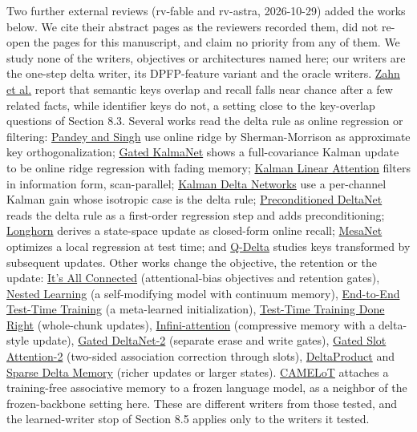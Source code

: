Two further external reviews (rv-fable and rv-astra, 2026-10-29) added the works
below. We cite their abstract pages as the reviewers recorded them, did not re-open the pages for this manuscript, and claim no priority from any of them.
We study none of the writers, objectives or architectures named here; our writers are the one-step delta writer, its DPFP-feature variant and the oracle writers.
\href{https://arxiv.org/abs/2601.15313}{Zahn et al.} report that semantic keys overlap and recall falls near chance after a few related facts, while identifier keys do
not, a setting close to the key-overlap questions of Section 8.3. Several works read the delta rule as online regression or filtering:
\href{https://arxiv.org/abs/2605.11196}{Pandey and Singh} use online ridge by Sherman-Morrison as approximate key orthogonalization;
\href{https://arxiv.org/abs/2511.21016}{Gated KalmaNet} shows a full-covariance Kalman update to be online ridge regression with fading memory;
\href{https://arxiv.org/abs/2602.10743}{Kalman Linear Attention} filters in information form, scan-parallel;
\href{https://arxiv.org/abs/2609.07816}{Kalman Delta Networks} use a per-channel Kalman gain whose isotropic case is the delta rule;
\href{https://arxiv.org/abs/2604.21100}{Preconditioned DeltaNet} reads the delta rule as a first-order regression step and adds preconditioning;
\href{https://arxiv.org/abs/2407.14207}{Longhorn} derives a state-space update as closed-form online recall;
\href{https://arxiv.org/abs/2506.05233}{MesaNet} optimizes a local regression at test time; and
\href{https://arxiv.org/abs/2606.08804}{Q-Delta} studies keys transformed by subsequent updates. Other works change the objective, the retention or the update:
\href{https://arxiv.org/abs/2504.13173}{It’s All Connected} (attentional-bias objectives and retention gates),
\href{https://arxiv.org/abs/2512.24695}{Nested Learning} (a self-modifying model with continuum memory),
\href{https://arxiv.org/abs/2512.23675}{End-to-End Test-Time Training} (a meta-learned initialization),
\href{https://arxiv.org/abs/2505.23884}{Test-Time Training Done Right} (whole-chunk updates),
\href{https://arxiv.org/abs/2404.07143}{Infini-attention} (compressive memory with a delta-style update),
\href{https://arxiv.org/abs/2605.22791}{Gated DeltaNet-2} (separate erase and write gates),
\href{https://arxiv.org/abs/2610.02816}{Gated Slot Attention-2} (two-sided association correction through slots),
\href{https://arxiv.org/abs/2502.10297}{DeltaProduct} and \href{https://arxiv.org/abs/2607.07386}{Sparse Delta Memory} (richer updates or larger states).
\href{https://arxiv.org/abs/2402.13449}{CAMELoT} attaches a training-free associative memory to a frozen language model, as a neighbor of the frozen-backbone
setting here. These are different writers from those tested, and the learned-writer stop of Section 8.5 applies only to the writers it tested.

